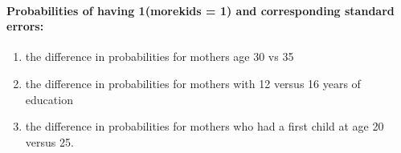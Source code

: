 \documentclass[11pt]{article}
\providecommand{\tightlist}{%
      \setlength{\itemsep}{0pt}\setlength{\parskip}{0pt}}
\begin{document}
    
    \paragraph{Probabilities of having 1(morekids = 1) and corresponding
standard
errors:}\label{probabilities-of-having-1morekids-1-and-corresponding-standard-errors}

\begin{enumerate}
\def\labelenumi{\arabic{enumi}.}
\tightlist
\item
  the difference in probabilities for mothers age 30 vs 35
\item
  the difference in probabilities for mothers with 12 versus 16 years of
  education
\item
  the difference in probabilities for mothers who had a first child at
  age 20 versus 25.
\end{enumerate}
\end{document}

